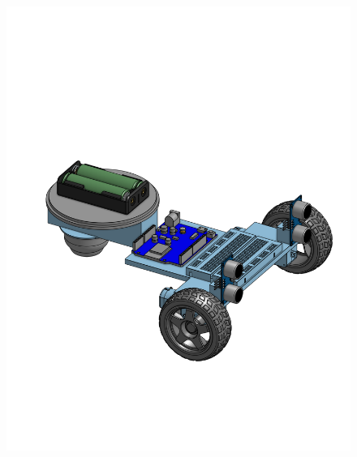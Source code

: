 \documentclass[a4paper,12pt]{article}
\begin{document}
\begin{center}\begin{figure}[H]\centering\includegraphics[height=0.45\textheight]{./model_images/a3.png}\end{figure}\FloatBarrier\end{center}
\end{document}
